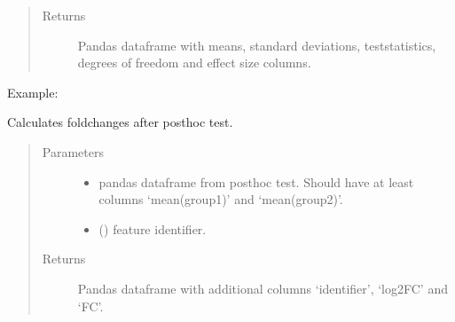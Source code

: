 \documentclass[letterpaper,10pt,english]{sphinxmanual}
\begin{document}
\begin{fulllineitems}
\begin{quote}
\begin{description}
\begin{itemize}
\end{itemize}

\item[{Returns}] \leavevmode
Pandas dataframe with means, standard deviations, test\sphinxhyphen{}statistics, degrees of freedom and effect size columns.

\end{description}\end{quote}

Example:

\begin{sphinxVerbatim}[commandchars=\\\{\}]
      
\end{sphinxVerbatim}

\end{fulllineitems}


\begin{fulllineitems}
\label{\detokenize{_autosummary/analytics_core.analytics:analytics_core.analytics.analytics.complement_posthoc}}
Calculates fold\sphinxhyphen{}changes after posthoc test.
\begin{quote}\begin{description}
\item[{Parameters}] \leavevmode\begin{itemize}
\item {} 
 \textendash{} pandas dataframe from posthoc test. Should have at least columns ‘mean(group1)’ and ‘mean(group2)’.

\item {} 
 () \textendash{} feature identifier.

\end{itemize}

\item[{Returns}] \leavevmode
Pandas dataframe with additional columns ‘identifier’, ‘log2FC’ and ‘FC’.

\end{description}\end{quote}

\end{fulllineitems}
\end{document}
